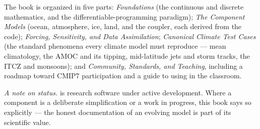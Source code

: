 The book is organized in five parts: \emph{Foundations} (the continuous and discrete
mathematics, and the differentiable-programming paradigm); \emph{The Component Models}
(ocean, atmosphere, ice, land, and the coupler, each derived from the code); \emph{Forcing,
Sensitivity, and Data Assimilation}; \emph{Canonical Climate Test Cases} (the standard
phenomena every climate model must reproduce --- mean climatology, the AMOC and its tipping,
mid-latitude jets and storm tracks, the ITCZ and monsoons); and \emph{Community, Standards,
and Teaching}, including a roadmap toward CMIP7 participation and a guide to using \model{} in
the classroom.

\bigskip
\noindent\textit{A note on status.} \model{} is research software under active development.
Where a component is a deliberate simplification or a work in progress, this book says so
explicitly --- the honest documentation of an evolving model is part of its scientific value.
